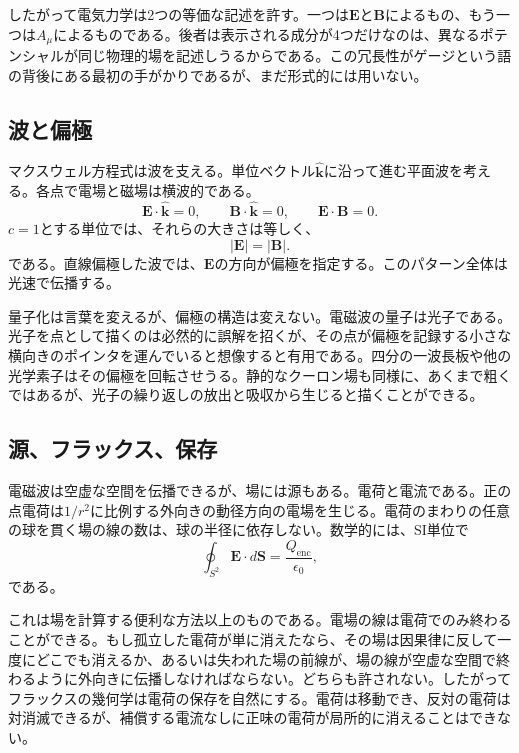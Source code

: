 したがって電気力学は2つの等価な記述を許す。一つは\(\boldsymbol E\)と\(\boldsymbol B\)によるもの、もう一つは\(A_\mu\)によるものである。後者は表示される成分が4つだけなのは、異なるポテンシャルが同じ物理的場を記述しうるからである。この冗長性がゲージという語の背後にある最初の手がかりであるが、まだ形式的には用いない。

\subsection{波と偏極}

マクスウェル方程式は波を支える。単位ベクトル\(\hat{\boldsymbol k}\)に沿って進む平面波を考える。各点で電場と磁場は横波的である。
\begin{equation}
\boldsymbol E\cdot\hat{\boldsymbol k}=0,
\qquad
\boldsymbol B\cdot\hat{\boldsymbol k}=0,
\qquad
\boldsymbol E\cdot\boldsymbol B=0.
\end{equation}
\(c=1\)とする単位では、それらの大きさは等しく、
\begin{equation}
|\boldsymbol E|=|\boldsymbol B|.
\end{equation}
である。直線偏極した波では、\(\boldsymbol E\)の方向が偏極を指定する。このパターン全体は光速で伝播する。

量子化は言葉を変えるが、偏極の構造は変えない。電磁波の量子は光子である。光子を点として描くのは必然的に誤解を招くが、その点が偏極を記録する小さな横向きのポインタを運んでいると想像すると有用である。四分の一波長板や他の光学素子はその偏極を回転させうる。静的なクーロン場も同様に、あくまで粗くではあるが、光子の繰り返しの放出と吸収から生じると描くことができる。

\subsection{源、フラックス、保存}

電磁波は空虚な空間を伝播できるが、場には源もある。電荷と電流である。正の点電荷は\(1/r^2\)に比例する外向きの動径方向の電場を生じる。電荷のまわりの任意の球を貫く場の線の数は、球の半径に依存しない。数学的には、SI単位で
\begin{equation}
\oint_{S^2}\boldsymbol E\cdot d\boldsymbol S
=\frac{Q_{\mathrm{enc}}}{\epsilon_0},
\label{eq:l5-gauss}
\end{equation}
である。

これは場を計算する便利な方法以上のものである。電場の線は電荷でのみ終わることができる。もし孤立した電荷が単に消えたなら、その場は因果律に反して一度にどこでも消えるか、あるいは失われた場の前線が、場の線が空虚な空間で終わるように外向きに伝播しなければならない。どちらも許されない。したがってフラックスの幾何学は電荷の保存を自然にする。電荷は移動でき、反対の電荷は対消滅できるが、補償する電流なしに正味の電荷が局所的に消えることはできない。

